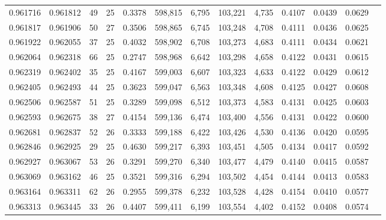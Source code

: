 \begin{tabular}{rrrrrrrrrrrrr}
0.961716 & 0.961812 &    49 &  25 &                                     0.3378 & 598,815 &   6,795 & 103,221 &   4,735 & 0.4107 & 0.0439 & 0.0629 \\
0.961817 & 0.961906 &    50 &  27 &                                     0.3506 & 598,865 &   6,745 & 103,248 &   4,708 & 0.4111 & 0.0436 & 0.0625 \\
0.961922 & 0.962055 &    37 &  25 &                                     0.4032 & 598,902 &   6,708 & 103,273 &   4,683 & 0.4111 & 0.0434 & 0.0621 \\
0.962064 & 0.962318 &    66 &  25 &                                     0.2747 & 598,968 &   6,642 & 103,298 &   4,658 & 0.4122 & 0.0431 & 0.0615 \\
0.962319 & 0.962402 &    35 &  25 &                                     0.4167 & 599,003 &   6,607 & 103,323 &   4,633 & 0.4122 & 0.0429 & 0.0612 \\
0.962405 & 0.962493 &    44 &  25 &                                     0.3623 & 599,047 &   6,563 & 103,348 &   4,608 & 0.4125 & 0.0427 & 0.0608 \\
0.962506 & 0.962587 &    51 &  25 &                                     0.3289 & 599,098 &   6,512 & 103,373 &   4,583 & 0.4131 & 0.0425 & 0.0603 \\
0.962593 & 0.962675 &    38 &  27 &                                     0.4154 & 599,136 &   6,474 & 103,400 &   4,556 & 0.4131 & 0.0422 & 0.0600 \\
0.962681 & 0.962837 &    52 &  26 &                                     0.3333 & 599,188 &   6,422 & 103,426 &   4,530 & 0.4136 & 0.0420 & 0.0595 \\
0.962846 & 0.962925 &    29 &  25 &                                     0.4630 & 599,217 &   6,393 & 103,451 &   4,505 & 0.4134 & 0.0417 & 0.0592 \\
0.962927 & 0.963067 &    53 &  26 &                                     0.3291 & 599,270 &   6,340 & 103,477 &   4,479 & 0.4140 & 0.0415 & 0.0587 \\
0.963069 & 0.963162 &    46 &  25 &                                     0.3521 & 599,316 &   6,294 & 103,502 &   4,454 & 0.4144 & 0.0413 & 0.0583 \\
0.963164 & 0.963311 &    62 &  26 &                                     0.2955 & 599,378 &   6,232 & 103,528 &   4,428 & 0.4154 & 0.0410 & 0.0577 \\
0.963313 & 0.963445 &    33 &  26 &                                     0.4407 & 599,411 &   6,199 & 103,554 &   4,402 & 0.4152 & 0.0408 & 0.0574 \\

\end{tabular}
